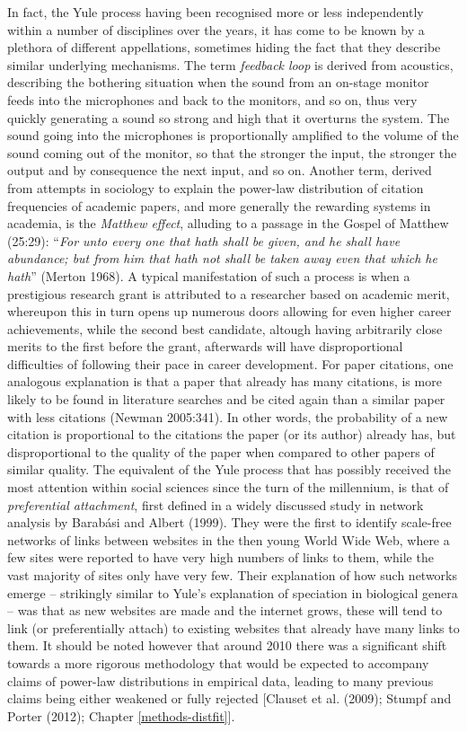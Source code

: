 \documentclass[
  12pt,
]{book}
\begin{document}
In fact, the Yule process having been recognised more or less independently within a number of disciplines over the years, it has come to be known by a plethora of different appellations, sometimes hiding the fact that they describe similar underlying mechanisms. The term \emph{feedback loop} is derived from acoustics, describing the bothering situation when the sound from an on-stage monitor feeds into the microphones and back to the monitors, and so on, thus very quickly generating a sound so strong and high that it overturns the system. The sound going into the microphones is proportionally amplified to the volume of the sound coming out of the monitor, so that the stronger the input, the stronger the output and by consequence the next input, and so on. Another term, derived from attempts in sociology to explain the power-law distribution of citation frequencies of academic papers, and more generally the rewarding systems in academia, is the \emph{Matthew effect}, alluding to a passage in the Gospel of Matthew (25:29): ``\emph{For unto every one that hath shall be given, and he shall have abundance; but from him that hath not shall be taken away even that which he hath}'' (Merton 1968). A typical manifestation of such a process is when a prestigious research grant is attributed to a researcher based on academic merit, whereupon this in turn opens up numerous doors allowing for even higher career achievements, while the second best candidate, altough having arbitrarily close merits to the first before the grant, afterwards will have disproportional difficulties of following their pace in career development. For paper citations, one analogous explanation is that a paper that already has many citations, is more likely to be found in literature searches and be cited again than a similar paper with less citations (Newman 2005:341). In other words, the probability of a new citation is proportional to the citations the paper (or its author) already has, but disproportional to the quality of the paper when compared to other papers of similar quality. The equivalent of the Yule process that has possibly received the most attention within social sciences since the turn of the millennium, is that of \emph{preferential attachment}, first defined in a widely discussed study in network analysis by Barabási and Albert (1999). They were the first to identify scale-free networks of links between websites in the then young World Wide Web, where a few sites were reported to have very high numbers of links to them, while the vast majority of sites only have very few. Their explanation of how such networks emerge -- strikingly similar to Yule's explanation of speciation in biological genera -- was that as new websites are made and the internet grows, these will tend to link (or preferentially attach) to existing websites that already have many links to them. It should be noted however that around 2010 there was a significant shift towards a more rigorous methodology that would be expected to accompany claims of power-law distributions in empirical data, leading to many previous claims being either weakened or fully rejected {[}Clauset et al. (2009); Stumpf and Porter (2012); Chapter \ref{methods-distfit}{]}.
\end{document}
